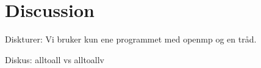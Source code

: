 \section{Discussion}

Diskturer: Vi bruker kun ene programmet med openmp og en tråd.

Diskus: alltoall vs alltoallv
